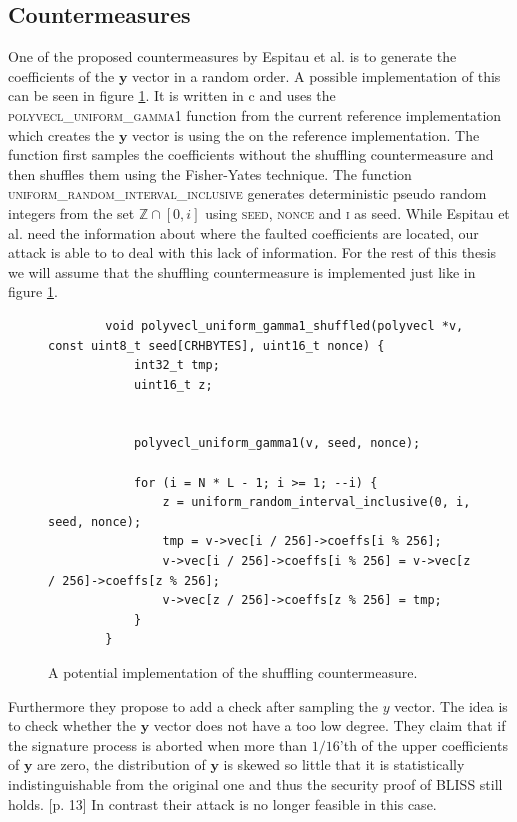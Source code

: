 \documentclass[a4paper,titlepage]{article}
\begin{document}
\subsection{Countermeasures}
\label{sec:countermeasure}
One of the proposed countermeasures by Espitau et al. is to generate the coefficients of the $\bm{y}$ vector in a random order. \cite[p. 13]{espitau} A possible implementation of this can be seen in figure \ref{fig:countermeasure}. It is written in c and uses the \textsc{polyvecl\_uniform\_gamma1} function from the current reference implementation \cite{referenceimpl} which creates the $\bm{y}$ vector is using the on the reference implementation.
The function first samples the coefficients without the shuffling countermeasure and then shuffles them using the Fisher-Yates technique. \cite{fisheryates} The function \textsc{uniform\_random\_interval\_inclusive} generates deterministic pseudo random integers from the set $ \mathds{Z} \cap [0, i]$ using \textsc{seed}, \textsc{nonce} and \textsc{i} as seed. While Espitau et al. need the information about where the faulted coefficients are located, our attack is able to to deal with this lack of information. For the rest of this thesis we will assume that the shuffling countermeasure is implemented just like in figure \ref{fig:countermeasure}.
\begin{figure}
    \centering
    \begin{verbatim}
        void polyvecl_uniform_gamma1_shuffled(polyvecl *v, const uint8_t seed[CRHBYTES], uint16_t nonce) {
            int32_t tmp;
            uint16_t z;
        
            
            polyvecl_uniform_gamma1(v, seed, nonce);
            
            for (i = N * L - 1; i >= 1; --i) {
                z = uniform_random_interval_inclusive(0, i, seed, nonce);
                tmp = v->vec[i / 256]->coeffs[i % 256];
                v->vec[i / 256]->coeffs[i % 256] = v->vec[z / 256]->coeffs[z % 256];
                v->vec[z / 256]->coeffs[z % 256] = tmp;
            }
        }
    \end{verbatim}
    \caption{A potential implementation of the shuffling countermeasure.}
    \label{fig:countermeasure}
\end{figure}

Furthermore they propose to add a check after sampling the $y$ vector. The idea is to check whether the $\bm{y}$ vector does not have a too low degree.
They claim that if the signature process is aborted when more than $1/16$'th of the upper coefficients of $\bm{y}$ are zero, the distribution of $\bm{y}$ is skewed so little that it is statistically indistinguishable from the original one and thus the security proof of BLISS still holds. \cite{espitau}[p. 13] In contrast their attack is no longer feasible in this case.
\end{document}
